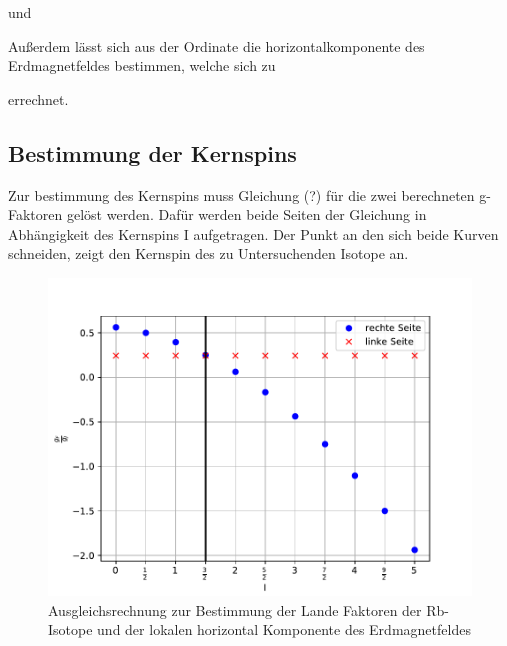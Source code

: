 

und



Außerdem lässt sich aus der Ordinate die horizontalkomponente des Erdmagnetfeldes bestimmen,
welche sich zu



errechnet.

\subsection{Bestimmung der Kernspins}
Zur bestimmung des Kernspins muss Gleichung (?) für die zwei berechneten g-Faktoren gelöst werden. Dafür werden beide Seiten der Gleichung in Abhängigkeit
des Kernspins I aufgetragen. Der Punkt an den sich beide Kurven schneiden, zeigt den Kernspin des zu Untersuchenden Isotope an.

\begin{figure}[H]
\centering
\includegraphics[scale=0.8]{./optischesPumpen/img/coreSpin1.pdf}
\caption{Ausgleichsrechnung zur Bestimmung der Lande Faktoren der Rb-Isotope und der lokalen horizontal Komponente des Erdmagnetfeldes}
\label{aufbau}
\end{figure}

